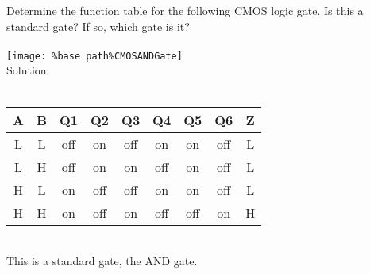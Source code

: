 Determine the function table for the following CMOS logic gate.  Is this a standard gate?  If so, which gate is it? \\ \\
\texttt{[image: \%base path\%CMOSANDGate]}\\

Solution: \\ \\
\begin{tabular}{ccccccccc}
  \textbf{A} & \textbf{B} & \textbf{Q1} & \textbf{Q2} & \textbf{Q3} & \textbf{Q4} & \textbf{Q5} & \textbf{Q6} & \textbf{Z} \\
  \hline
  L & L & off & on & off & on & on & off & L\\
  L & H & off & on & on & off & on & off & L\\
  H & L & on & off & off & on & on & off & L\\
  H & H & on & off & on & off & off & on & H\\
\end{tabular} \\
This is a standard gate, the AND gate.\\
